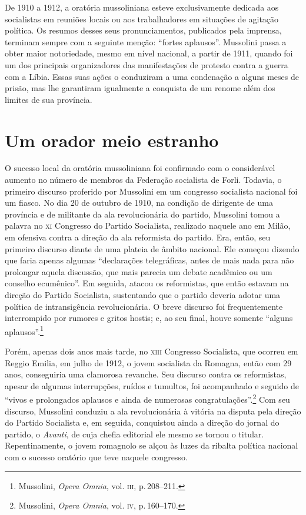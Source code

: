 De 1910 a 1912, a oratória mussoliniana esteve exclusivamente dedicada
aos socialistas em reuniões locais ou aos trabalhadores em situações de
agitação política. Os resumos desses seus pronunciamentos, publicados
pela imprensa, terminam sempre com a seguinte menção: ``fortes
aplausos''. Mussolini passa a obter maior notoriedade, mesmo em nível
nacional, a partir de 1911, quando foi um dos principais organizadores
das manifestações de protesto contra a guerra com a Líbia. Essas suas
ações o conduziram a uma condenação a alguns meses de prisão, mas lhe
garantiram igualmente a conquista de um renome além dos limites de sua
província.

\section{Um orador meio estranho}

O sucesso local da oratória mussoliniana foi confirmado com o
considerável aumento no número de membros da Federação socialista de
Forli. Todavia, o primeiro discurso proferido por Mussolini em um
congresso socialista nacional foi um fiasco. No dia 20 de outubro de
1910, na condição de dirigente de uma província e de militante da ala
revolucionária do partido, Mussolini tomou a palavra no \textsc{xi} Congresso do
Partido Socialista, realizado naquele ano em Milão, em ofensiva contra a
direção da ala reformista do partido. Era, então, seu primeiro discurso
diante de uma plateia de âmbito nacional. Ele começou dizendo que faria
apenas algumas ``declarações telegráficas, antes de mais nada para não
prolongar aquela discussão, que mais parecia um debate acadêmico ou um
conselho ecumênico''. Em seguida, atacou os reformistas, que então
estavam na direção do Partido Socialista, sustentando que o partido
deveria adotar uma política de intransigência revolucionária. O breve
discurso foi frequentemente interrompido por rumores e gritos hostis; e,
ao seu final, houve somente ``alguns aplausos''.\footnote{Mussolini,
  \emph{Opera Omnia}, vol. \textsc{iii}, p.\,208--211.}

Porém, apenas dois anos mais tarde, no \textsc{xiii} Congresso Socialista, que
ocorreu em Reggio Emilia, em julho de 1912, o jovem socialista da
Romagna, então com 29 anos, conseguiria uma clamorosa revanche. Seu
discurso contra os reformistas, apesar de algumas interrupções, ruídos e
tumultos, foi acompanhado e seguido de ``vivos e prolongados aplausos e
ainda de numerosas congratulações''.\footnote{Mussolini, \emph{Opera
  Omnia}, vol. \textsc{iv}, p.\,160--170.} Com seu discurso, Mussolini conduziu a
ala revolucionária à vitória na disputa pela direção do Partido
Socialista e, em seguida, conquistou ainda a direção do jornal do
partido, o \emph{Avanti}, de cuja chefia editorial ele mesmo se tornou o
titular. Repentinamente, o jovem romagnolo se alçou às luzes da ribalta
política nacional com o sucesso oratório que teve naquele congresso.


